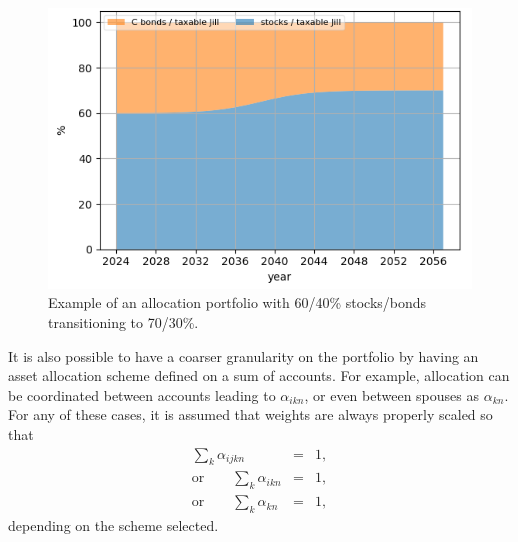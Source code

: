 \documentclass{article}[fleqn,12pt]
\begin{document}
\begin{description}[leftmargin=4em,style=multiline]
	\begin{figure}[t]
	\includegraphics{allocations.png}
		\caption{\small Example of an allocation portfolio with 60/40\% stocks/bonds 
		transitioning to 70/30\%. \label{Fig:allocations}}
	\end{figure}
	It is also possible to have a coarser granularity on the portfolio by
	having an asset allocation scheme
	defined on a sum of accounts. For example, allocation can be coordinated between accounts
	leading to $\alpha_{ikn}$, or even between spouses as $\alpha_{kn}$.
	For any of these cases, it is assumed that weights are always properly scaled so that
	\begin{eqnarray}
		\sum_{k} \alpha_{ijkn} &=& 1, \nonumber\\
		\text{or} \qquad \sum_{k} \alpha_{ikn} &=& 1, \nonumber\\
		\text{or} \qquad \sum_{k} \alpha_{kn} &=& 1,
	\end{eqnarray}
	depending on the scheme selected.


\end{description}
\end{document}

